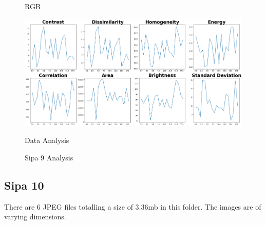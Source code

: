 \begin{figure}[ht]
\begin{minipage}[t]{0.25\textwidth}
        \caption*{RGB}
    \end{minipage}\hfill
    \begin{minipage}[t]{0.50\textwidth}
        \centering
        \includegraphics[width=\textwidth]{Figures/EDA_Charts/9/da.png}
        \caption*{Data Analysis}
    \end{minipage}
    \caption{Sipa 9 Analysis}
    \label{fig:Sipa 9 Analysis}
\end{figure}

\newpage

\subsection{Sipa 10}

There are 6 JPEG files totalling a size of 3.36mb in this folder. The images are of varying dimensions.


